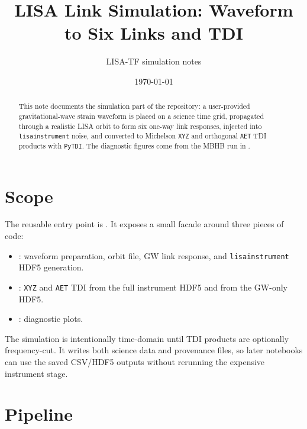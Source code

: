 \documentclass[11pt]{article}
\title{LISA Link Simulation: Waveform to Six Links and TDI}
\author{LISA-TF simulation notes}
\date{\today}
\begin{document}
\maketitle

\begin{abstract}
This note documents the simulation part of the repository: a user-provided
gravitational-wave strain waveform is placed on a science time grid, propagated
through a realistic LISA orbit to form six one-way link responses, injected into
\texttt{lisainstrument} noise, and converted to Michelson \texttt{XYZ} and
orthogonal \texttt{AET} TDI products with \texttt{PyTDI}. The diagnostic figures
come from the MBHB run in .
\end{abstract}

\section{Scope}

The reusable entry point is . It exposes a
small facade around three pieces of code:
\begin{itemize}
  \item {}: waveform preparation, orbit file,
  GW link response, and \texttt{lisainstrument} HDF5 generation.
  \item {}: \texttt{XYZ} and \texttt{AET} TDI from
  the full instrument HDF5 and from the GW-only HDF5.
  \item {}: diagnostic plots.
\end{itemize}

The simulation is intentionally time-domain until TDI products are optionally
frequency-cut. It writes both science data and provenance files, so later
notebooks can use the saved CSV/HDF5 outputs without rerunning the expensive
instrument stage.

\section{Pipeline}

\begin{center}
\end{center}
\end{document}
